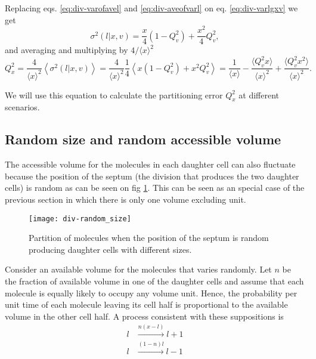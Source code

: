 Replacing eqs. \eqref{eq:div-varofavel} and \eqref{eq:div-aveofvarl} on eq. \eqref{eq:div-varlgxv} we get
\begin{equation*}
  \sigma^2(l|x,v) = \frac{x}{4}(1-Q_v^2)+\frac{x^2}{4}Q_v^2,
\end{equation*}
and averaging and multiplying by $4/\langle x\rangle^2$
\begin{equation}
  \label{eq:div-Qdis}
  Q_x^2 = \frac{4}{\langle x\rangle^2}\left\langle\sigma^2(l|x,v)\right\rangle = \frac{4}{\langle x\rangle^2}\frac{1}{4}\left\langle x(1-Q_v^2) + x^2Q_v^2 \right\rangle = \frac{1}{\langle x\rangle} - \frac{\langle Q_v^2x\rangle}{\langle x\rangle^2} + \frac{\langle Q_v^2x^2\rangle}{\langle x\rangle^2}.
\end{equation}

We will use this equation to calculate the partitioning error $Q_x^2$ at different scenarios.

\subsection{Random size and random accessible volume}

The accessible volume for the molecules in each daughter cell can also fluctuate because the position of the septum (the division that produces the two daughter cells) is random as can be seen on fig \ref{fig:div-random_size}. This can be seen as an special case of the previous section in which there is only one volume excluding unit.
\begin{figure}[H]
  \centering
  \texttt{[image: div-random\_size]}
  \caption[Partition of molecules with random size of the daughter cells]{\label{fig:div-random_size}Partition of molecules when the position of the septum is random producing daughter cells with different sizes.}
\end{figure}

Consider an available volume for the molecules that varies randomly. Let $n$ be the fraction of available volume in one of the daughter cells and assume that each molecule is equally likely to occupy any volume unit. Hence, the probability per unit time of each molecule leaving its cell half is proportional to the available volume in the other cell half. A process consistent with these suppositions is
\begin{equation*}
  \begin{split}
    l&\xrightarrow{n(x-l)}l+1\\
    l&\xrightarrow{(1-n)l}l-1
  \end{split}
\end{equation*}

